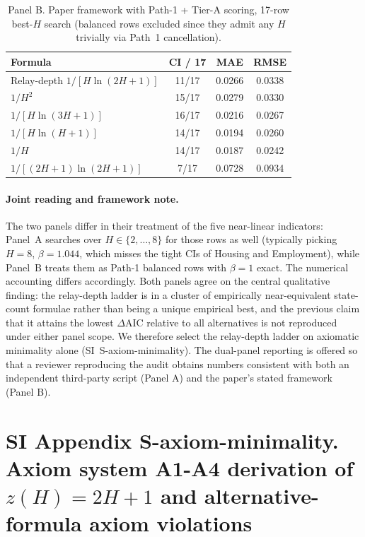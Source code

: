 \begin{table}[!h]
\caption{Panel B. Paper framework with Path-1 + Tier-A scoring, 17-row best-$H$ search (balanced rows excluded since they admit any $H$ trivially via Path~1 cancellation).}
\label{tab:alt_panelB}
\centering
\begin{tabular}{lccc}
\toprule
Formula & CI / 17 & MAE & RMSE \\
\midrule
Relay-depth $1/[H\ln(2H+1)]$               & 11/17 & 0.0266 & 0.0338 \\
$1/H^{2}$                           & 15/17 & 0.0279 & 0.0330 \\
$1/[H\ln(3H+1)]$                    & 16/17 & 0.0216 & 0.0267 \\
$1/[H\ln(H+1)]$                     & 14/17 & 0.0194 & 0.0260 \\
$1/H$                               & 14/17 & 0.0187 & 0.0242 \\
$1/[(2H+1)\ln(2H+1)]$               &  7/17 & 0.0728 & 0.0934 \\
\bottomrule
\end{tabular}
\end{table}

\paragraph{Joint reading and framework note.} The two panels differ in their treatment of the five near-linear indicators: Panel~A searches over $H\!\in\!\{2,\dots,8\}$ for those rows as well (typically picking $H\!=\!8$, $\beta\!=\!1.044$, which misses the tight CIs of Housing and Employment), while Panel~B treats them as Path-1 balanced rows with $\beta\!=\!1$ exact. The numerical accounting differs accordingly. Both panels agree on the central qualitative finding: the relay-depth ladder is in a cluster of empirically near-equivalent state-count formulae rather than being a unique empirical best, and the previous claim that it attains the lowest $\Delta\mathrm{AIC}$ relative to all alternatives is not reproduced under either panel scope. We therefore select the relay-depth ladder on axiomatic minimality alone (SI~\textsf{S-axiom-minimality}). The dual-panel reporting is offered so that a reviewer reproducing the audit obtains numbers consistent with both an independent third-party script (Panel A) and the paper's stated framework (Panel B).

\clearpage
\section*{SI Appendix S-axiom-minimality. Axiom system A1-A4 derivation of $z(H)=2H+1$ and alternative-formula axiom violations}
\sloppy\label{sec:S-axiom-minimality}

